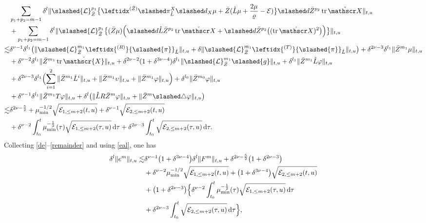 \documentclass[11pt,twoside]{article}
\def\vp{\varphi}
\def\f{\frac}
\begin{document}
\begin{align}
&\sum_{p_1+p_2=m-1}\delta^l\|\slashed{\mathcal L}_{\bar Z}^{p_1}\bigl\{\leftidx^{{(\bar Z)}}\slashed\pi_{\mathring L}^X\slashed d_X\mu+\bar Z(\mathring L\mu+\f{2\mu}{\varrho}-\mathcal E)\bigr\}\slashed d\bar Z^{p_2}\operatorname{tr}\check{\mathscr X}\|_{t,u}\nonumber\\
&+\sum_{p_1+p_2=m-1}\delta^l\|\slashed{\mathcal L}_{\bar Z}^{p_1}\bigl\{(\bar Z\mu)\Bigl(\slashed d\mathring L\bar Z^{p_2}\operatorname{tr}\check{\mathscr X}+\slashed d\bar Z^{p_2}\bigl((\operatorname{tr}\check{\mathscr X})^2\bigr)\Bigr)\bigr\}\|_{t,u}\nonumber\\
\lesssim &\delta^{\nu-1}\delta^{l_1}\bigl(\|\slashed{\mathcal{L}}_{\bar{Z}}^{m_1}\leftidx{^{(R)}}{\slashed{\pi}}_{\mathring{L}}\|_{t,u}
+\delta\|\slashed{\mathcal{L}}_{\bar{Z}}^{m_1}\leftidx{^{(T)}}{\slashed{\pi}}_{\mathring{L}}\|_{t,u} \bigr)+\delta^{2\nu-3}\delta^{l_1}\|\bar Z^{m_1}\mu\|_{t,u}\nonumber\\
&+\delta^{\nu-2}\delta^{l_1}\|\bar{Z}^{m_1}\operatorname{tr}\check{\mathscr{X}}\|_{t,u}+\delta^{2\nu-2}(1+\delta^{3\nu-4})\delta^{l_1}\|\slashed{\mathcal{L}}_{\bar{Z}}^{m_1}\slashed{g}\|_{t,u}+\delta^{l_1}\|\bar Z^{m_1}\mathring L\vp\|_{t,u}\nonumber\\
&+\delta^{2\nu-3}\delta^{l_1}\Bigl(\sum_{i=1}^2\|\bar{Z}^{m_1}\check{L}^i\|_{t,u}
+\|\bar{Z}^{m_1}\upsilon\|_{t,u}+\|\bar{Z}^{m_1}\vp\|_{t,u} \Bigr)+\delta^{l_0}\|\bar Z^{m_0}\vp\|_{t,u}\nonumber\\
&+\delta^{\nu-1}\delta^{l_1}\|\bar Z^{m_1}T\vp\|_{t,u}+\delta^{l}\big(\|\mathring LR\bar Z^m\vp\|_{t,u}+\|\bar Z^m\slashed\triangle\vp\|_{t,u}\big)\nonumber\\
\lesssim&\delta^{2\nu-\f52}
+\mu_{\min}^{-1/2}\sqrt{\mathcal{E}_{1,\leq m+2}(t,u)}
+\delta^{\nu-1}\sqrt{\mathcal{E}_{2,\leq m+2}(t,u)} \label{remainder}\\
&+\delta^{\nu-2}\int_{t_0}^t\mu_{\min}^{-\f12}(\tau)\sqrt{\mathcal{E}_{1,\leq m+2}(\tau,u)}\,\mathrm{d}\tau
+\delta^{2\nu-3}\int_{t_0}^t\sqrt{\mathcal{E}_{2,\leq m+2}(\tau,u)}\,\mathrm{d}\tau.\nonumber
\end{align}
Collecting \eqref{de}--\eqref{remainder} and using \eqref{eal}, one has
\begin{equation*}
\begin{split}
\delta^l \|e^m\|_{t,u}
\lesssim& \delta^{\nu-1} \bigl(1 + \delta^{3\nu-4}\bigr) \delta^l \|F^m\|_{t,u}
+ \delta^{2\nu-\frac{5}{2}} \bigl(1 + \delta^{2\nu-3}\bigr) \\
&+ \delta^{\nu-2} \mu_{\min}^{-1/2} \sqrt{\mathcal{E}_{1,\leq m+2}(t,u)}
+ \bigl(1 + \delta^{3\nu-4}\bigr) \sqrt{\mathcal{E}_{2,\leq m+2}(t,u)} \\
&+ \bigl(1 + \delta^{2\nu-3}\bigr) \Bigl\{
\delta^{\nu-2} \int_{t_0}^t \mu_{\min}^{-\frac{1}{2}}(\tau) \sqrt{\mathcal{E}_{1,\leq m+2}(\tau,u)} \,\mathrm{d}\tau \\
&+ \delta^{2\nu-3} \int_{t_0}^t \sqrt{\mathcal{E}_{2,\leq m+2}(\tau,u)} \,\mathrm{d}\tau
\Bigr\},
\end{split}
\end{equation*}
\end{document}

